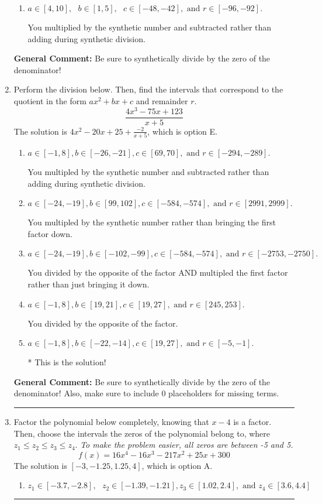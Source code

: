 \documentclass{extbook}[14pt]
\newcommand{\litem}[1]{\item #1

\rule{\textwidth}{0.4pt}}
\begin{document}
\begin{enumerate}
{\begin{enumerate}[label=\Alph*.]
 You multiplied by the synthetic number rather than bringing the first factor down.
\item \( a \in [4, 10], \text{   } b \in [1, 5], \text{   } c \in [-48, -42], \text{   and   } r \in [-96, -92]. \)

 You multiplied by the synthetic number and subtracted rather than adding during synthetic division.
\end{enumerate}

\textbf{General Comment:} Be sure to synthetically divide by the zero of the denominator!
}
\litem{
Perform the division below. Then, find the intervals that correspond to the quotient in the form $ax^2+bx+c$ and remainder $r$.
\[ \frac{4x^{3} -75 x + 123}{x + 5} \]The solution is \( 4x^{2} -20 x + 25 + \frac{-2}{x + 5} \), which is option E.\begin{enumerate}[label=\Alph*.]
\item \( a \in [-1, 8], b \in [-26, -21], c \in [69, 70], \text{ and } r \in [-294, -289]. \)

 You multipled by the synthetic number and subtracted rather than adding during synthetic division.
\item \( a \in [-24, -19], b \in [99, 102], c \in [-584, -574], \text{ and } r \in [2991, 2999]. \)

 You multipled by the synthetic number rather than bringing the first factor down.
\item \( a \in [-24, -19], b \in [-102, -99], c \in [-584, -574], \text{ and } r \in [-2753, -2750]. \)

 You divided by the opposite of the factor AND multipled the first factor rather than just bringing it down.
\item \( a \in [-1, 8], b \in [19, 21], c \in [19, 27], \text{ and } r \in [245, 253]. \)

 You divided by the opposite of the factor.
\item \( a \in [-1, 8], b \in [-22, -14], c \in [19, 27], \text{ and } r \in [-5, -1]. \)

* This is the solution!
\end{enumerate}

\textbf{General Comment:} Be sure to synthetically divide by the zero of the denominator! Also, make sure to include 0 placeholders for missing terms.
}
\litem{
Factor the polynomial below completely, knowing that $x -4$ is a factor. Then, choose the intervals the zeros of the polynomial belong to, where $z_1 \leq z_2 \leq z_3 \leq z_4$. \textit{To make the problem easier, all zeros are between -5 and 5.}
\[ f(x) = 16x^{4} -16 x^{3} -217 x^{2} +25 x + 300 \]The solution is \( [-3, -1.25, 1.25, 4] \), which is option A.\begin{enumerate}[label=\Alph*.]
\item \( z_1 \in [-3.7, -2.8], \text{   }  z_2 \in [-1.39, -1.21], z_3 \in [1.02, 2.4], \text{   and   } z_4 \in [3.6, 4.4] \)


\end{enumerate}}
\end{enumerate}
\end{document}
